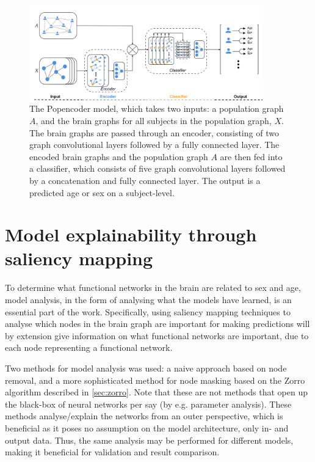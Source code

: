 \begin{figure}[!htbp]
    \centering
    \includegraphics[width=0.9\textwidth]{chapters/images_methods/popencoder_v2.png}
    \caption{The Popencoder model, which takes two inputs: a population graph $A$, and the brain graphs for all subjects in the population graph, $X$. The brain graphs are passed through an encoder, consisting of two graph convolutional layers followed by a fully connected layer. The encoded brain graphs and the population graph $A$ are then fed into a classifier, which consists of five graph convolutional layers followed by a concatenation and fully connected layer. The output is a predicted age or sex on a subject-level.}
    \label{fig:popencoder}
\end{figure}

\section{Model explainability through saliency mapping}
To determine what functional networks in the brain are related to sex and age, model analysis, in the form of analysing what the models have learned, is an essential part of the work. Specifically, using saliency mapping techniques to analyse which nodes in the brain graph are important for making predictions will by extension give information on what functional networks are important, due to each node representing a functional network. 

Two methods for model analysis was used: a naive approach based on node removal, and a more sophisticated method for node masking based on the Zorro algorithm described in \cref{sec:zorro}. Note that these are not methods that open up the black-box of neural networks per say (by e.g. parameter analysis). These methods analyse/explain the networks from an outer perspective, which is beneficial as it poses no assumption on the model architecture, only in- and output data. Thus, the same analysis may be performed for different models, making it beneficial for validation and result comparison. 

